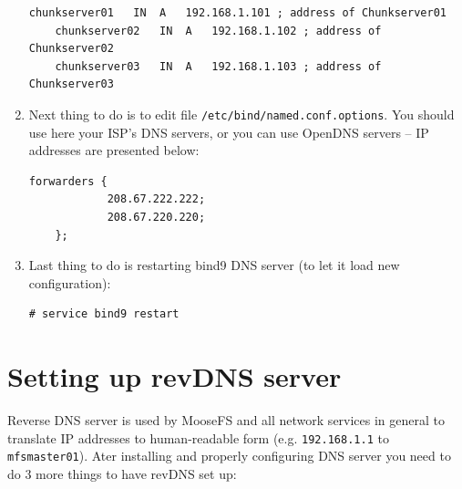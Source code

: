 \documentclass[a4paper,11pt,english]{report}
\def\code#1{\texttt{#1}}
\begin{document}
\begin{enumerate}
\begin{lstlisting}[caption={mfsnetwork.lan configuration file}]
	chunkserver01	IN	A	192.168.1.101 ; address of Chunkserver01
	chunkserver02	IN	A	192.168.1.102 ; address of Chunkserver02
	chunkserver03	IN	A	192.168.1.103 ; address of Chunkserver03
					\end{lstlisting}
					
				\item Next thing to do is to edit file \code{/etc/bind/named.conf.options}. You should use here your ISP's DNS servers, or you can use OpenDNS servers -- IP addresses are presented below:
					
					\begin{lstlisting}[caption={\code{named.conf.options} configuration file}]
	forwarders {
			208.67.222.222;
			208.67.220.220;
	};
					\end{lstlisting}
					
				\item Last thing to do is restarting bind9 DNS server (to let it load new configuration):
					
					\begin{lstlisting}[caption={Restarting bind9}]
	# service bind9 restart
					\end{lstlisting}
			\end{enumerate}
			
		\section{Setting up revDNS server}
			Reverse DNS server is used by MooseFS and all network services in general to translate IP addresses to human-readable form (e.g. \code{192.168.1.1} to \code{mfsmaster01}).
			Ater installing and properly configuring DNS server you need to do 3 more things to have revDNS set up:
			
\end{document}
